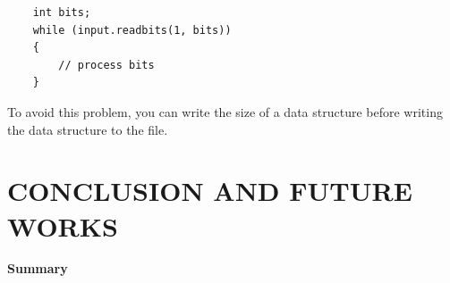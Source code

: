 \documentclass[12pt]{report}
\begin{document}
\begin{verbatim}
	int bits; 
	while (input.readbits(1, bits)) 
	{ 
		// process bits 
	} 
\end{verbatim}



To avoid this problem, you can write the size of a data structure before writing the data structure to the file.
\pagestyle{fancy}
\chead{}
\rfoot{\small{\thepage}}
\renewcommand{\headrulewidth}{0.4pt}
\renewcommand{\footrulewidth}{0.4pt}
\chapter{CONCLUSION AND FUTURE WORKS}

\textbf{Summary}
\end{document}

